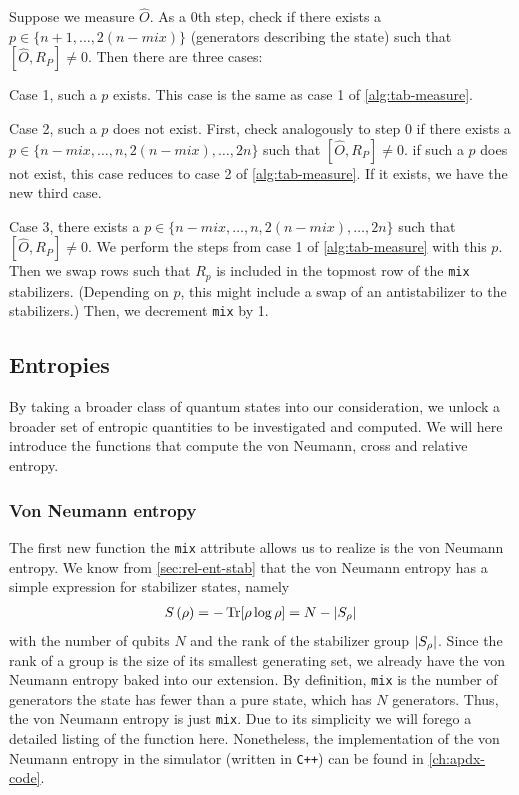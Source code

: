 \begin{alg}\label{alg:sim-meas-mixed}
  Suppose we measure $\hat{O}$. As a $0$th step, check if there exists a $p \in
  \{ n+1, \ldots, 2(n-mix) \}$ (generators describing the state) such that
  $[\hat{O}, R_P] \neq 0$. Then there are three cases:

  Case 1, such a $p$ exists. This case is the same as case 1 of
  \cref{alg:tab-measure}.

  Case 2, such a $p$ does not exist. First, check analogously to step $0$ if
  there exists a $p \in \{n-mix, \ldots, n, 2(n-mix), \ldots, 2n\}$ such that
  $[\hat{O}, R_P] \neq 0$. if such a $p$ does not exist, this case reduces to
  case 2 of \cref{alg:tab-measure}. If it exists, we have the new third case.

  Case 3, there exists a $p \in \{n-mix, \ldots, n, 2(n-mix), \ldots, 2n\}$
  such that $[\hat{O}, R_P] \neq 0$. We perform the steps from case 1 of
  \cref{alg:tab-measure} with this $p$. Then we swap rows such that $R_p$ is
  included in the topmost row of the \verb|mix| stabilizers. (Depending on $p$,
  this might include a swap of an antistabilizer to the stabilizers.) Then, we
  decrement \verb|mix| by 1.
\end{alg}
\subsection{Entropies}\label{sec:sim-entropies}
By taking a broader class of quantum states into our consideration, we unlock a
broader set of entropic quantities to be investigated and computed. We will
here introduce the functions that compute the von Neumann, cross and relative
entropy.
\subsubsection{Von Neumann entropy}
The first new function the \verb|mix| attribute allows us to realize is the von
Neumann entropy. We know from \cref{sec:rel-ent-stab} that the von Neumann
entropy has a simple expression for stabilizer states, namely
\begin{align}
  S\left( \rho \right) = -\Tr[\rho\log\rho] = N - \abs{S_\rho}
\end{align}
with the number of qubits $N$ and the rank of the stabilizer group
$\abs{S_\rho}$. Since the rank of a group is the size of its smallest
generating set, we already have the von Neumann entropy baked into our
extension. By definition, \verb|mix| is the number of generators the state has
fewer than a pure state, which has $N$ generators. Thus, the von Neumann
entropy is just \verb|mix|. Due to its simplicity we will forego a detailed
listing of the function here. Nonetheless, the implementation of the von
Neumann entropy in the simulator (written in \verb|C++|) can be found in
\cref{ch:apdx-code}.

